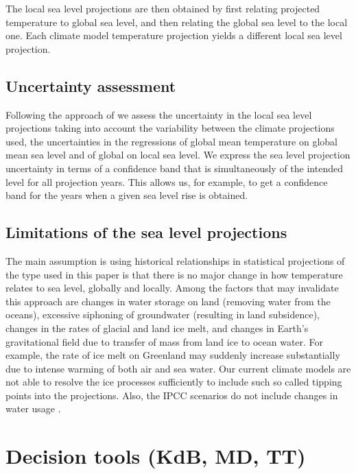 \documentclass[wrr, draft]{agutex}
\begin{document}
\begin{article}
The local sea level projections are then obtained by first relating projected temperature to global sea level, and then relating the global sea level to the local one. Each climate model temperature projection yields a different local sea level projection.

\subsection{Uncertainty assessment}
\label{unc_ass}
Following the approach of \citet{Guttorp2014} we assess the uncertainty in the local sea level projections taking into account the variability between the climate projections used, the uncertainties in the regressions of global mean temperature on global mean sea level and of global on local sea level. We express the sea level projection uncertainty in terms of a confidence band that is simultaneously of the intended  level  for all projection years. This allows us, for example, to get a confidence band for the years when a given sea level rise is obtained.


\subsection{Limitations of the sea level projections}
The main assumption is using historical relationships in statistical projections of the type used in this paper is that there is no major change in how temperature relates to sea level, globally and locally. Among the factors that may invalidate this approach are changes in water storage on land (removing water from the oceans), excessive siphoning of groundwater (resulting in land subsidence), changes in the rates of glacial and land ice melt, and changes in Earth's gravitational field due to transfer of mass from land ice to ocean water. For example, the rate of ice melt on Greenland may suddenly increase substantially due to intense warming of both air and sea water. Our current climate models are not able to resolve the ice processes sufficiently to include such so called tipping points into the projections. Also, the IPCC scenarios do not include changes in water usage \citep{change}.

\section{Decision tools {\color{blue} (KdB, MD, TT)}}


\end{article}
\end{document}
